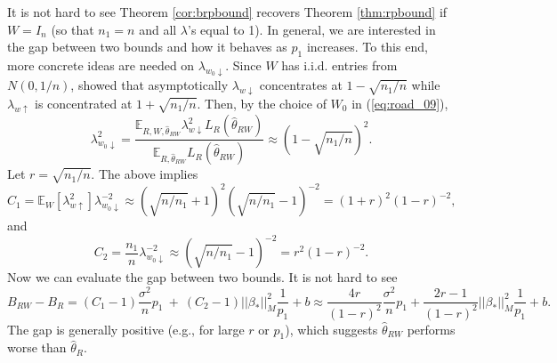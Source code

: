 \documentclass[a4paper,fleqn]{cas-sc}
\theoremstyle{plain}
\newcommand{\E}{\mathbb{E}}
\newcommand{\be}{\beta}
\newcommand{\hte}{\hat{\theta}}
\begin{document}
It is not hard to see Theorem \ref{cor:brpbound} recovers 
Theorem \ref{thm:rpbound} 
if $W = I_n$ (so that $n_1 = n$ 
and all $\lambda$'s 
equal to 1).
In general, we are interested 
in the gap between two bounds 
and how it behaves as $p_1$ increases. 
To this end, more concrete ideas are needed 
on $\lambda_{w_0 \downarrow}$. 
Since $W$ has i.i.d. entries from 
$N(0,1/n)$, \citep{bai1993limit} showed 
that asymptotically $\lambda_{w \downarrow}$ 
concentrates at 
$1-\sqrt{n_1/n}$ while 
$\lambda_{w \uparrow}$ 
is concentrated at 
$1+ \sqrt{n_1/n}$. 
Then, by the choice of 
$W_0$ in (\ref{eq:road_09}), 
\begin{equation}
\lambda^2_{w_0 \downarrow} 
= \frac{\E_{R, W, \hte_{RW}} 
\lambda^2_{w \downarrow} 
L_{R}(\hte_{RW}) 
}{\E_{R, \hte_{RW}} L_{R}(\hte_{RW})} 
\approx (1 - \sqrt{n_1/n})^2. 
\end{equation}
Let $r = \sqrt{n_1/n}$. The above implies
\begin{equation}
\label{eq:c1}
C_1 = \E_W[\lambda^2_{w \uparrow}] 
\lambda^{-2}_{w_0 \downarrow}  
\approx (\sqrt{n/n_1}+1)^2 
(\sqrt{n/n_1}-1)^{-2} 
= (1+r)^2 (1-r)^{-2}, 
\end{equation}
and 
\begin{equation}
C_2 = \frac{n_1}{n} 
\lambda^{-2}_{w_0 \downarrow}
\approx {(\sqrt{n/n_1}-1)^{-2}} 
= r^2 (1-r)^{-2}.
\end{equation}
Now we can evaluate the gap 
between two bounds. 
It is not hard to see 
\begin{equation}
\label{eq:gap2}
B_{RW} - B_R = (C_1 -1) 
\frac{\sigma^2}{n} p_1 \ + 
\ (C_2-1) || \be_* ||_{M}^2 
\frac{1}{p_1} + b
\approx \frac{4r}{(1-r)^2} 
\frac{\sigma^2}{n}  p_1 
+ \frac{2r - 1}{(1-r)^2} 
||\be_*||_M^2 \frac{1}{p_1} + b.
\end{equation}
The gap is generally positive 
(e.g., for large $r$ or $p_1$),  
which suggests $\hte_{RW}$ performs 
worse than $\hte_{R}$. 
\end{document}
